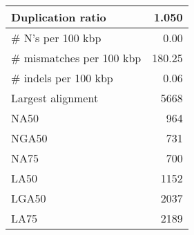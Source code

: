 \documentclass[12pt,a4paper]{article}
\begin{document}
\begin{table}[ht]
\begin{center}
\begin{tabular}{|l*{1}{|r}|}
Duplication ratio & 1.050 \\ \hline
\# N's per 100 kbp & 0.00 \\ \hline
\# mismatches per 100 kbp & 180.25 \\ \hline
\# indels per 100 kbp & 0.06 \\ \hline
Largest alignment & 5668 \\ \hline
NA50 & 964 \\ \hline
NGA50 & 731 \\ \hline
NA75 & 700 \\ \hline
LA50 & 1152 \\ \hline
LGA50 & 2037 \\ \hline
LA75 & 2189 \\ \hline
\end{tabular}
\end{center}
\end{table}
\end{document}
